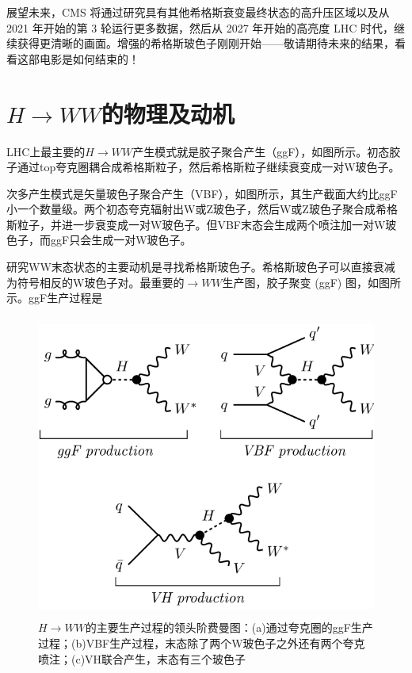 展望未来，CMS 将通过研究具有其他希格斯衰变最终状态的高升压区域以及从 2021 年开始的第 3 轮运行更多数据，然后从 2027 年开始的高亮度 LHC 时代，继续获得更清晰的画面。增强的希格斯玻色子刚刚开始——敬请期待未来的结果，看看这部电影是如何结束的！  

\section{$H\to WW$的物理及动机}
LHC上最主要的$H\to WW$产生模式就是胶子聚合产生（ggF），如图所示。初态胶子通过top夸克圈耦合成希格斯粒子，然后希格斯粒子继续衰变成一对W玻色子。

次多产生模式是矢量玻色子聚合产生（VBF），如图所示，其生产截面大约比ggF小一个数量级。两个初态夸克辐射出W或Z玻色子，然后W或Z玻色子聚合成希格斯粒子，并进一步衰变成一对W玻色子。但VBF末态会生成两个喷注加一对W玻色子，而ggF只会生成一对W玻色子。

研究WW末态状态的主要动机是寻找希格斯玻⾊⼦。希格斯玻⾊⼦可以直接衰减为符号相反的W玻⾊⼦对。最重要的$\to WW$⽣产图，胶⼦聚变 (ggF) 图，如图所示。ggF生产过程是
\begin{figure}[H]
 \centering
 \includegraphics[height=10cm, width=12cm]{pictures/HWW_production.png}
  \caption{$H\to WW$的主要生产过程的领头阶费曼图：(a)通过夸克圈的ggF生产过程；(b)VBF生产过程，末态除了两个W玻色子之外还有两个夸克喷注；(c)VH联合产生，末态有三个玻色子}
 \label{fig:2.4}
\end{figure}

